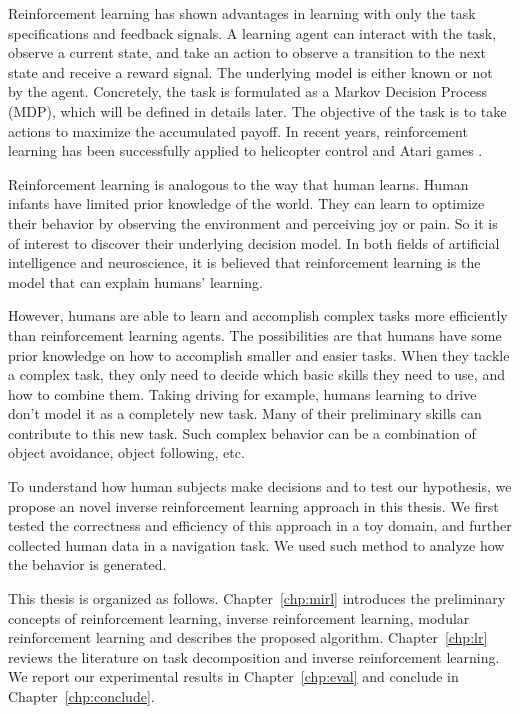 Reinforcement learning has shown advantages in learning with only the task
specifications and feedback signals. A learning agent can interact with the
task, observe a current state, and take an action to observe a
transition to the next state and receive a reward signal. The underlying model is either
known or not by the agent. Concretely, the task is formulated as a
Markov Decision Process (MDP), which will be defined in details later.
The objective of the task is to take actions to maximize the accumulated payoff.
In recent years, reinforcement learning has been successfully applied to
helicopter control \cite{ng2006autonomous} and Atari games \cite{mnih2013playing}.

Reinforcement learning is analogous to the way that human learns. Human infants
have limited prior knowledge of the world. They can learn to optimize
their behavior by observing the environment and perceiving joy or pain. So it is
of interest to discover their underlying decision model. In both fields
of artificial intelligence and neuroscience, it is believed that reinforcement
learning is the model that can explain humans' learning.

However, humans are able to learn and accomplish complex tasks more efficiently than
reinforcement learning agents. The possibilities are that humans have some prior
knowledge on how to accomplish smaller and easier tasks. When they tackle a
complex task, they only need to decide which basic skills they need to use, and
how to combine them. Taking driving for example, humans learning to drive don't
model it as a completely new task. Many of their preliminary skills can
contribute to this new task. Such complex behavior can be a combination of
object avoidance, object following, etc.

To understand how human subjects make decisions and to test our hypothesis, we
propose an novel inverse reinforcement learning approach in this thesis.
We first tested the correctness and efficiency of this approach in a toy domain,
and further collected human data in a navigation task. We used such method
to analyze how the behavior is generated.

This thesis is organized as follows. Chapter~\ref{chp:mirl} introduces the
preliminary concepts of reinforcement learning, inverse reinforcement learning,
modular reinforcement learning and describes the proposed algorithm.
Chapter~\ref{chp:lr} reviews the literature on task decomposition and inverse
reinforcement learning. We report our experimental results in
Chapter~\ref{chp:eval} and conclude in Chapter~\ref{chp:conclude}.

